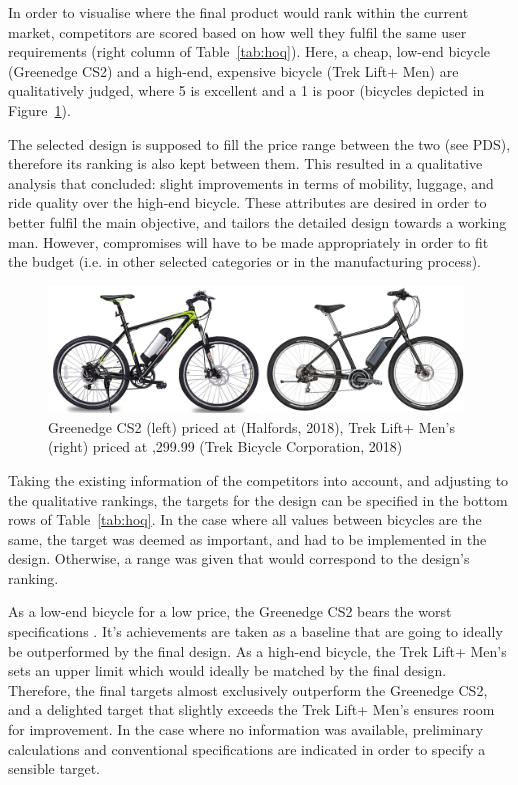 \documentclass[a4paper,11pt]{article}
\begin{document}
In order to visualise where the final product would rank within the current market, competitors are scored based on how well they fulfil the same user requirements (right column of Table~\ref{tab:hoq}). Here, a cheap, low-end bicycle (Greenedge CS2) and a high-end, expensive bicycle (Trek Lift+ Men) are qualitatively judged, where 5 is excellent and a 1 is poor (bicycles depicted in Figure~\ref{fig:bcom}). 

The selected design is supposed to fill the price range between the two (see PDS), therefore its ranking is also kept between them. This resulted in a qualitative analysis that concluded: slight improvements in terms of mobility, luggage, and ride quality over the high-end bicycle. These attributes are desired in order to better fulfil the main objective, and tailors the detailed design towards a working man. However, compromises will have to be made appropriately in order to fit the budget (i.e. in other selected categories or in the manufacturing process).

\begin{figure}[!ht]
	\centering
	\includegraphics[width=0.98\textwidth]{bikec}
	\caption{Greenedge CS2 (left) priced at   (Halfords, 2018), Trek Lift+ Men's (right) priced at ,299.99 (Trek Bicycle Corporation, 2018)}
	\label{fig:bcom}
\end{figure}

Taking the existing information of the competitors into account, and adjusting to the qualitative rankings, the targets for the design can be specified in the bottom rows of Table~\ref{tab:hoq}. In the case where all values between bicycles are the same, the target was deemed as important, and had to be implemented in the design. Otherwise, a range was given that would correspond to the design's ranking.

As a low-end bicycle for a low price, the Greenedge CS2 bears the worst specifications \cite{cs2}. It's achievements are taken as a baseline that are going to ideally be outperformed by the final design. As a high-end bicycle, the Trek Lift+ Men's sets an upper limit \cite{trek} which would ideally be matched by the final design. Therefore, the final targets almost exclusively outperform the Greenedge CS2, and a delighted target that slightly exceeds the Trek Lift+ Men's ensures room for improvement. In the case where no information was available, preliminary calculations and conventional specifications are indicated in order to specify a sensible target.
\end{document}
